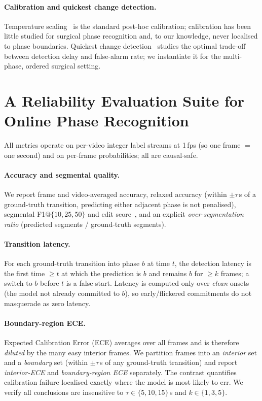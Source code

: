\documentclass[11pt]{article}
\begin{document}
\paragraph{Calibration and quickest change detection.} Temperature
scaling~\cite{guo2017} is the standard post-hoc calibration; calibration has been
little studied for surgical phase recognition and, to our knowledge, never localised
to phase boundaries. Quickest change detection~\cite{page1954,lorden1971,moustakides1986}
studies the optimal trade-off between detection delay and
false-alarm rate; we instantiate it for the multi-phase, ordered surgical setting.

\section{A Reliability Evaluation Suite for Online Phase Recognition}
\label{sec:suite}
All metrics operate on per-video integer label streams at 1\,fps (so one frame
$=$ one second) and on per-frame probabilities; all are causal-safe.

\paragraph{Accuracy and segmental quality.} We report frame and video-averaged
accuracy, relaxed accuracy (within $\pm\tau$\,s of a ground-truth transition,
predicting either adjacent phase is not penalised), segmental
F1@$\{10,25,50\}$ and edit score~\cite{farha2019}, and an explicit
\emph{over-segmentation ratio} (predicted segments / ground-truth segments).

\paragraph{Transition latency.} For each ground-truth transition into phase $b$ at
time $t$, the detection latency is the first time $\ge t$ at which the prediction is
$b$ and remains $b$ for $\ge k$ frames; a switch to $b$ before $t$ is a false start.
Latency is computed only over \emph{clean} onsets (the model not already committed
to $b$), so early/flickered commitments do not masquerade as zero latency.

\paragraph{Boundary-region ECE.} Expected Calibration Error (ECE) averages over all
frames and is therefore \emph{diluted} by the many easy interior frames. We
partition frames into an \emph{interior} set and a \emph{boundary} set (within
$\pm\tau$\,s of any ground-truth transition) and report
\emph{interior-ECE} and \emph{boundary-region ECE} separately. The contrast
quantifies calibration failure localised exactly where the model is most likely to
err. We verify all conclusions are insensitive to $\tau\!\in\!\{5,10,15\}$\,s and
$k\!\in\!\{1,3,5\}$.
\end{document}
